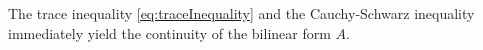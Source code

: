 \documentclass[sn-mathphys-num]{sn-jnl}
\numberwithin{equation}{section}
\newcommand{\tnorm}[1]{\vert\hspace{-0.3mm}\Vert#1\Vert\hspace{-0.3mm}\vert}
\newcommand{\ProdFullyDiscrSpace}[2]{ \mathcal{W}^{ {#1},{#2}}_{h, \Delta t  } }
\newcommand{\Uh}{\underline{\mathbf{U}}_h}
\newcommand{\Yh}{\underline{\mathbf{Y}}_h}
\newcommand{\Zh}{\underline{\mathbf{Z}}_h}
\newcommand{\Wh}{\underline{\mathbf{W}}_h}
\begin{document}


The trace inequality \eqref{eq:traceInequality} and the Cauchy-Schwarz inequality immediately yield the continuity of the bilinear form $A$.
\end{document}
